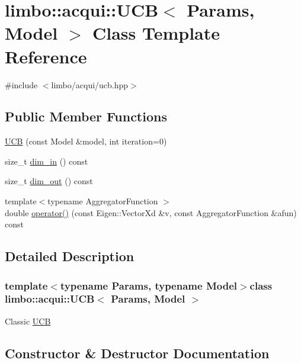 \hypertarget{classlimbo_1_1acqui_1_1_u_c_b}{}\section{limbo\+:\+:acqui\+:\+:U\+C\+B$<$ Params, Model $>$ Class Template Reference}
\label{classlimbo_1_1acqui_1_1_u_c_b}


{\ttfamily \#include $<$limbo/acqui/ucb.\+hpp$>$}

\subsection*{Public Member Functions}
\begin{DoxyCompactItemize}
\item 
\hyperlink{classlimbo_1_1acqui_1_1_u_c_b_ae4410ba09273ea88b36130ea916fcc60}{U\+C\+B} (const Model \&model, int iteration=0)
\item 
size\+\_\+t \hyperlink{classlimbo_1_1acqui_1_1_u_c_b_ab922a11b709216f35db6ee83fcb86ed5}{dim\+\_\+in} () const 
\item 
size\+\_\+t \hyperlink{classlimbo_1_1acqui_1_1_u_c_b_aa6870bb7764a6f729db39f86eb005d54}{dim\+\_\+out} () const 
\item 
{\footnotesize template$<$typename Aggregator\+Function $>$ }\\double \hyperlink{classlimbo_1_1acqui_1_1_u_c_b_a46ab881ea6bc364bf52c2fa04cfaa1da}{operator()} (const Eigen\+::\+Vector\+Xd \&v, const Aggregator\+Function \&afun) const 
\end{DoxyCompactItemize}


\subsection{Detailed Description}
\subsubsection*{template$<$typename Params, typename Model$>$class limbo\+::acqui\+::\+U\+C\+B$<$ Params, Model $>$}

Classic \hyperlink{classlimbo_1_1acqui_1_1_u_c_b}{U\+C\+B} 

\subsection{Constructor \& Destructor Documentation}
\hypertarget{classlimbo_1_1acqui_1_1_u_c_b_ae4410ba09273ea88b36130ea916fcc60}{}
